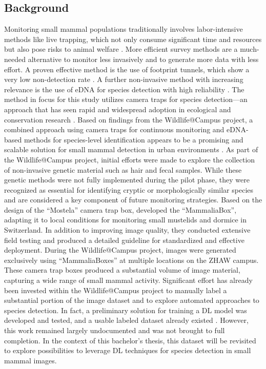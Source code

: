 \subsection{Background}
Monitoring small mammal populations traditionally involves labor-intensive methods like live trapping, which not only consume significant time and resources but also pose risks to animal welfare \autocite{grafWildlifeCampusKleineSaeugetiere2022}.
More efficient survey methods are a much-needed alternative to monitor less invasively and to generate more data with less effort.
A proven effective method is the use of footprint tunnels, which show a very low non-detection rate \autocite{yarnellUsingOccupancyAnalysis2014}.
A further non-invasive method with increasing relevance is the use of \ac{eDNA} for species detection with high reliability \autocite{thomsenEnvironmentalDNAEmerging2015}.
The method in focus for this study utilizes camera traps for species detection---an approach that has seen rapid and widespread adoption in ecological and conservation research \autocite{delisleNextGenerationCameraTrapping2021}.
Based on findings from the Wildlife@Campus project, a combined approach using camera traps for continuous monitoring and \acs{eDNA}-based methods for species-level identification appears to be a promising and scalable solution for small mammal detection in urban environments \autocite{grafWildlifeCampusKleineSaeugetiere2022}.
As part of the Wildlife@Campus project, initial efforts were made to explore the collection of non-invasive genetic material such as hair and fecal samples.
While these genetic methods were not fully implemented during the pilot phase, they were recognized as essential for identifying cryptic or morphologically similar species and are considered a key component of future monitoring strategies.
Based on the design of the \enquote{Mostela} camera trap box, \textcite{aegerterMonitoringKleinmustelidenSchlaefern2019} developed the \enquote{MammaliaBox}, adapting it to local conditions for monitoring small mustelids and dormice in Switzerland.
In addition to improving image quality, they conducted extensive field testing and produced a detailed guideline for standardized and effective deployment.
During the Wildlife@Campus project, images were generated exclusively using \enquote{MammaliaBoxes} at multiple locations on the ZHAW campus. 
These camera trap boxes produced a substantial volume of image material, capturing a wide range of small mammal activity.
Significant effort has already been invested within the Wildlife@Campus project to manually label a substantial portion of the image dataset and to explore automated approaches to species detection.
In fact, a preliminary solution for training a \ac{DL} model was developed and tested, and a usable labeled dataset already existed \autocite{ratnaweeraWildlifeCampusProgressReports2021}.
However, this work remained largely undocumented and was not brought to full completion. 
In the context of this bachelor's thesis, this dataset will be revisited to explore possibilities to leverage \ac{DL} techniques for species detection in small mammal images.

